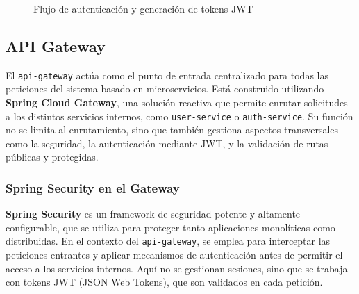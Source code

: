 \begin{figure}[H]
    \centering
    \caption{Flujo de autenticación y generación de tokens JWT}
    \label{fig:auth-service-class-diagram}
\end{figure}

\subsection{API Gateway}
El \texttt{api-gateway} actúa como el punto de entrada centralizado para todas las peticiones del sistema basado en microservicios. Está construido utilizando \textbf{Spring Cloud Gateway}, una solución reactiva que permite enrutar solicitudes a los distintos servicios internos, como \texttt{user-service} o \texttt{auth-service}. Su función no se limita al enrutamiento, sino que también gestiona aspectos transversales como la seguridad, la autenticación mediante JWT, y la validación de rutas públicas y protegidas.

\subsubsection{Spring Security en el Gateway}

\textbf{Spring Security} es un framework de seguridad potente y altamente configurable, que se utiliza para proteger tanto aplicaciones monolíticas como distribuidas. En el contexto del \texttt{api-gateway}, se emplea para interceptar las peticiones entrantes y aplicar mecanismos de autenticación antes de permitir el acceso a los servicios internos. Aquí no se gestionan sesiones, sino que se trabaja con tokens JWT (JSON Web Tokens), que son validados en cada petición.

